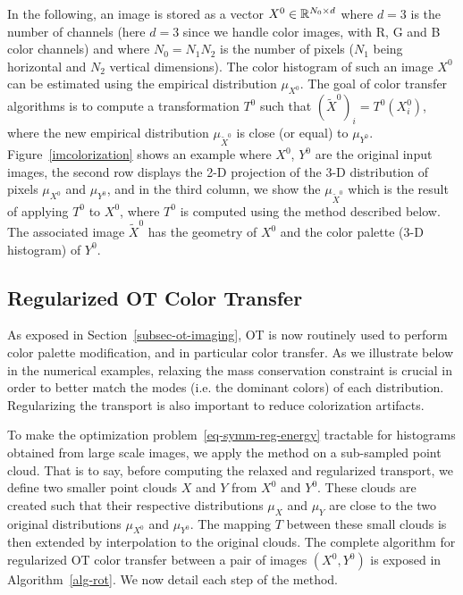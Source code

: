 In the following, an image is stored as a vector $X^0 \in \mathbb{R}^{N_0 \times d}$ where $d=3$ is the number of channels (here $d=3$ since we handle color images, with R, G and B color channels) and where $N_0=N_1 N_2$ is the number of pixels ($N_1$ being horizontal and $N_2$ vertical dimensions). The color histogram of such an image $X^0$ can be estimated using the empirical distribution $\mu_{X^0}$. The goal of color transfer algorithms is to compute a transformation $T^0$ such that $(\tilde X^0)_i = T^0(X^0_i)$, where the new empirical distribution $\mu_{\tilde X^0}$ is close (or equal) to $\mu_{Y^0}$. Figure~\ref{imcolorization} shows an example where $X^0$, $Y^0$ are the original input images, the second row displays the 2-D projection of the 3-D distribution of pixels $\mu_{X^0}$ and $\mu_{Y^0}$, and in the third column, we show the $\mu_{\tilde X^0}$ which is the result of applying $T^0$ to $X^0$, where $T^0$ is computed using the method described below. The associated image ${\tilde X^0}$ has the geometry of $X^0$ and the color palette (3-D histogram) of $Y^0$.



\subsection{Regularized OT Color Transfer}

As exposed in Section~\ref{subsec-ot-imaging}, OT is now routinely used to perform color palette modification, and in particular color transfer. As we illustrate below in the numerical examples, relaxing the mass conservation constraint is crucial in order to better match the modes (i.e. the dominant colors) of each distribution. Regularizing the transport is also important to reduce colorization artifacts.

To make the optimization problem~\eqref{eq-symm-reg-energy} tractable for histograms obtained from large scale images, we apply the method on a sub-sampled point cloud. That is to say, before computing the relaxed and regularized transport, we define two smaller point clouds $X$ and $Y$ from $X^0$ and $Y^0$. These clouds are created such that their respective distributions $\mu_X$ and $\mu_Y$ are close to the two original distributions $\mu_{X^0}$ and $\mu_{Y^0}$. The mapping $T$ between these small clouds is then extended by interpolation to the original clouds. The complete algorithm for regularized OT color transfer between a pair of images $(X^0,Y^0)$ is exposed in Algorithm~\ref{alg-rot}. We now detail each step of the method. 

